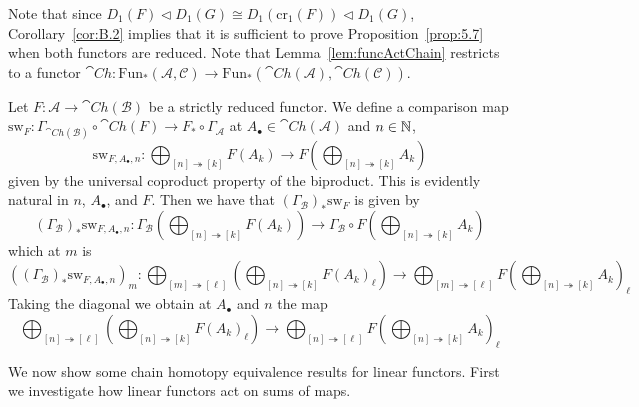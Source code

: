 Note that since $D_1(F)\lhd D_1(G)\cong D_1(\text{cr}_1(F))\lhd D_1(G)$, Corollary~\ref{cor:B.2} implies that it is sufficient to prove Proposition~\ref{prop:5.7} when both functors are reduced. Note that Lemma~\ref{lem:funcActChain} restricts to a functor $\cat{Ch}:\text{Fun}_*(\mathcal{A},\mathcal{C})\to \text{Fun}_*(\cat{Ch}(\mathcal{A}),\cat{Ch}(\mathcal{C}))$. 


\begin{rmk}
    Let $F:\mathcal{A}\to \cat{Ch}(\mathcal{B})$ be a strictly reduced functor. We define a comparison map $\text{sw}_F:\Gamma_{\cat{Ch}(\mathcal{B})}\circ \cat{Ch}(F)\to F_*\circ \Gamma_\mathcal{A}$ at $A_\bullet \in \cat{Ch}(\mathcal{A})$ and $n \in \mathbb N$,
    \begin{equation*}
        \text{sw}_{F,A_\bullet,n}:\bigoplus_{[n]\twoheadrightarrow [k]}F(A_k)\to F\left(\bigoplus_{[n]\twoheadrightarrow [k]}A_k\right)
    \end{equation*}
    given by the universal coproduct property of the biproduct. This is evidently natural in $n$, $A_\bullet$, and $F$. Then we have that $(\Gamma_{\mathcal{B}})_*\text{sw}_F$ is given by 
    \begin{equation*}
        (\Gamma_{\mathcal{B}})_*\text{sw}_{F,A_\bullet,n}:\Gamma_\mathcal{B}\left(\bigoplus_{[n]\twoheadrightarrow [k]}F(A_k)\right)\to \Gamma_\mathcal{B}\circ F\left(\bigoplus_{[n]\twoheadrightarrow [k]}A_k\right)
    \end{equation*} 
    which at $m$ is
    \begin{equation*}
        ((\Gamma_{\mathcal{B}})_*\text{sw}_{F,A_\bullet,n})_m:\bigoplus_{[m]\twoheadrightarrow[\ell]}\left(\bigoplus_{[n]\twoheadrightarrow [k]}F(A_k)_\ell\right)\to \bigoplus_{[m]\twoheadrightarrow[\ell]}F\left(\bigoplus_{[n]\twoheadrightarrow [k]}A_k\right)_\ell
    \end{equation*}
    Taking the diagonal we obtain at $A_\bullet$ and $n$ the map
    \begin{equation*}
        \bigoplus_{[n]\twoheadrightarrow[\ell]}\left(\bigoplus_{[n]\twoheadrightarrow[k]}F(A_k)_\ell\right) \to \bigoplus_{[n]\twoheadrightarrow[\ell]}F\left(\bigoplus_{[n]\twoheadrightarrow[k]}A_k\right)_\ell
    \end{equation*}
\end{rmk}

We now show some chain homotopy equivalence results for linear functors. First we investigate how linear functors act on sums of maps.

